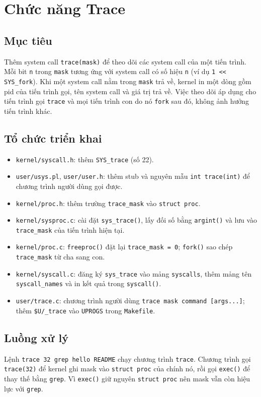 \section{Chức năng Trace}

\subsection{Mục tiêu}
Thêm system call \texttt{trace(mask)} để theo dõi các system call của một tiến trình. Mỗi bit \texttt{n} trong \texttt{mask} tương ứng với system call có số hiệu \texttt{n} (ví dụ \texttt{1 << SYS\_fork}). Khi một system call nằm trong \texttt{mask} trả về, kernel in một dòng gồm pid của tiến trình gọi, tên system call và giá trị trả về. Việc theo dõi áp dụng cho tiến trình gọi \texttt{trace} và mọi tiến trình con do nó \texttt{fork} sau đó, không ảnh hưởng tiến trình khác.

\subsection{Tổ chức triển khai}
\begin{itemize}
  \item \texttt{kernel/syscall.h}: thêm \texttt{SYS\_trace} (số 22).
  \item \texttt{user/usys.pl}, \texttt{user/user.h}: thêm stub và nguyên mẫu \texttt{int trace(int)} để chương trình người dùng gọi được.
  \item \texttt{kernel/proc.h}: thêm trường \texttt{trace\_mask} vào \texttt{struct proc}.
  \item \texttt{kernel/sysproc.c}: cài đặt \texttt{sys\_trace()}, lấy đối số bằng \texttt{argint()} và lưu vào \texttt{trace\_mask} của tiến trình hiện tại.
  \item \texttt{kernel/proc.c}: \texttt{freeproc()} đặt lại \texttt{trace\_mask = 0}; \texttt{fork()} sao chép \texttt{trace\_mask} từ cha sang con.
  \item \texttt{kernel/syscall.c}: đăng ký \texttt{sys\_trace} vào mảng \texttt{syscalls}, thêm mảng tên \texttt{syscall\_names} và in kết quả trong \texttt{syscall()}.
  \item \texttt{user/trace.c}: chương trình người dùng \texttt{trace mask command [args...]}; thêm \texttt{\$U/\_trace} vào \texttt{UPROGS} trong \texttt{Makefile}.
\end{itemize}

\subsection{Luồng xử lý}
Lệnh \texttt{trace 32 grep hello README} chạy chương trình \texttt{trace}. Chương trình gọi \texttt{trace(32)} để kernel ghi mask vào \texttt{struct proc} của chính nó, rồi gọi \texttt{exec()} để thay thế bằng \texttt{grep}. Vì \texttt{exec()} giữ nguyên \texttt{struct proc} nên mask vẫn còn hiệu lực với \texttt{grep}.

